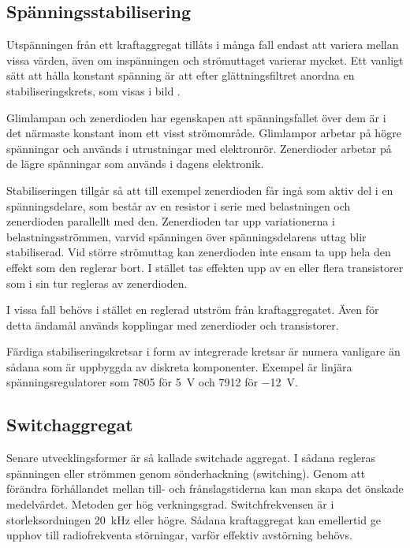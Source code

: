 
\subsection{Spänningsstabilisering}
\label{spänningsstabilisering}

Utspänningen från ett kraftaggregat tillåts i många fall endast att variera
mellan vissa värden, även om inspänningen och strömuttaget varierar mycket.
Ett vanligt sätt att hålla konstant spänning är att efter glättningsfiltret
anordna en stabiliseringskrets, som visas i bild .

Glimlampan och zenerdioden har egenskapen att spänningsfallet över dem är i det
närmaste konstant inom ett visst strömområde.
Glimlampor arbetar på högre spänningar och används i utrustningar med
elektronrör.
Zenerdioder arbetar på de lägre spänningar som används i dagens elektronik.

Stabiliseringen tillgår så att till exempel zenerdioden får ingå som aktiv del
i en spänningsdelare, som består av en resistor i serie med belastningen och
zenerdioden parallellt med den.
Zenerdioden tar upp variationerna i belastningsströmmen, varvid spänningen över
spänningsdelarens uttag blir stabiliserad.
Vid större strömuttag kan zenerdioden inte ensam ta upp hela den effekt som den
reglerar bort.
I stället tas effekten upp av en eller flera transistorer som i sin tur
regleras av zenerdioden.

I vissa fall behövs i stället en reglerad utström från kraftaggregatet.
Även för detta ändamål används kopplingar med zenerdioder och transistorer.

Färdiga stabiliseringskretsar i form av integrerade kretsar är numera vanligare
än sådana som är uppbyggda av diskreta komponenter.
Exempel är linjära spänningsregulatorer som 7805 för \SI{5}{\volt} och 7912 för
\SI{-12}{\volt}.

\subsection{Switchaggregat}

Senare utvecklingsformer är så kallade switchade aggregat.
I sådana regleras spänningen eller strömmen genom sönderhackning (switching).
Genom att förändra förhållandet mellan till- och frånslagstiderna kan man skapa
det önskade medelvärdet.
Metoden ger hög verkningsgrad.
Switchfrekvensen är i storleksordningen \SI{20}{\kilo\hertz} eller högre.
Sådana kraftaggregat kan emellertid ge upphov till radiofrekventa störningar,
varför effektiv avstörning behövs.

